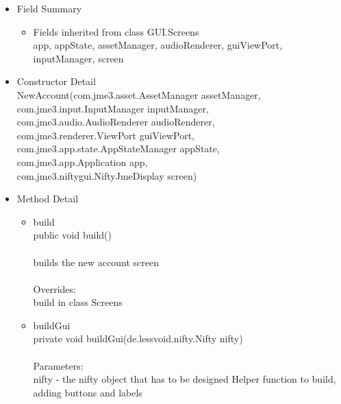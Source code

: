 \documentclass[letterpaper]{article}
\begin{document}
									\begin{itemize}
										\item	Field Summary
												\begin{itemize}
													\item	Fields inherited from class GUI.Screens \\
															app, appState, assetManager, audioRenderer, guiViewPort, inputManager, screen
												\end{itemize}
										\item	Constructor Detail \\
												NewAccount(com.jme3.asset.AssetManager assetManager, \\
				         com.jme3.input.InputManager inputManager, \\
				         com.jme3.audio.AudioRenderer audioRenderer, \\
				         com.jme3.renderer.ViewPort guiViewPort, \\
				         com.jme3.app.state.AppStateManager appState, \\
				         com.jme3.app.Application app, \\
				         com.jme3.niftygui.NiftyJmeDisplay screen)
										\item	Method Detail
												\begin{itemize}
													\item	build \\
															public void build() \\ \\
															builds the new account screen \\ \\
															Overrides: \\
															build in class Screens
													\item	buildGui \\
															private void buildGui(de.lessvoid.nifty.Nifty nifty) \\ \\
															Parameters: \\
															nifty - the nifty object that has to be designed Helper function to build, adding buttons and labels
												\end{itemize}
									\end{itemize}
								\newpage
\end{document}
